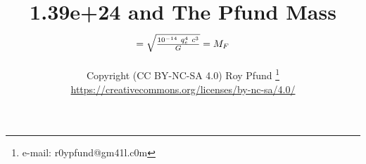 
\usepackage{pst-node}%
\usepackage{tabu}
\usepackage{natbib}
\usepackage{graphicx}
\usepackage[colorlinks=true,linkcolor=black,anchorcolor=black,citecolor=black,filecolor=black,menucolor=black,runcolor=black,urlcolor=black]{hyperref}%
\title{1.39e+24 and The Pfund Mass $= \sqrt{10^{-14}~q_e^4~c^3 \over G}= M_F$ }
\author{Copyright (CC BY-NC-SA 4.0) Roy Pfund \thanks{e-mail: r0ypfund@gm41l.c0m}\\
\url{https://creativecommons.org/licenses/by-nc-sa/4.0/}}


\maketitle


